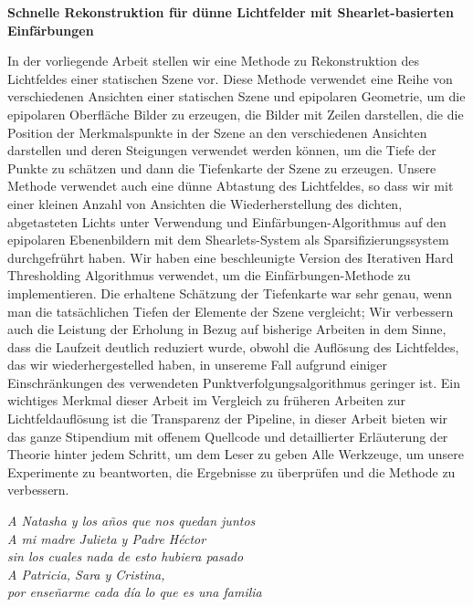 \documentclass[11pt, english, singlespacing, headsepline, ]{MastersDoctoralThesis}
\theoremstyle{definition}
\begin{document}
\begin{center}
\textbf{Schnelle Rekonstruktion für dünne Lichtfelder mit Shearlet-basierten Einf\"arbungen}
\end{center}

In der vorliegende Arbeit stellen wir eine Methode zu Rekonstruktion des Lichtfeldes einer statischen Szene vor. Diese Methode verwendet eine Reihe von verschiedenen Ansichten einer statischen Szene und epipolaren Geometrie, um die epipolaren Oberfläche Bilder zu erzeugen, die Bilder mit Zeilen darstellen, die die Position der Merkmalspunkte in der Szene an den verschiedenen Ansichten darstellen und deren Steigungen verwendet werden k\"onnen, um die Tiefe der Punkte zu sch\"atzen und dann die Tiefenkarte der Szene zu erzeugen. Unsere Methode verwendet auch eine d\"unne Abtastung des Lichtfeldes, so dass wir mit einer kleinen Anzahl von Ansichten die Wiederherstellung des dichten, abgetasteten Lichts unter Verwendung und Einf\"arbungen-Algorithmus auf den epipolaren Ebenenbildern mit dem Shearlets-System als Sparsifizierungssystem durchgefr\"uhrt haben. Wir haben eine beschleunigte Version des Iterativen Hard Thresholding Algorithmus verwendet, um die Einf\"arbungen-Methode zu implementieren. Die erhaltene Sch\"atzung der Tiefenkarte war sehr genau, wenn man die tats\"achlichen Tiefen der Elemente der Szene vergleicht; Wir verbessern auch die Leistung der Erholung in Bezug auf bisherige Arbeiten in dem Sinne, dass die Laufzeit deutlich reduziert wurde, obwohl die Aufl\"osung des Lichtfeldes, das wir wiederhergestelled haben, in unsereme Fall aufgrund einiger Einschr\"ankungen des verwendeten Punktverfolgungsalgorithmus geringer ist. Ein wichtiges Merkmal dieser Arbeit im Vergleich zu fr\"uheren Arbeiten zur Lichtfeldauflösung ist die Transparenz der Pipeline, in dieser Arbeit bieten wir das ganze Stipendium mit offenem Quellcode und detaillierter Erläuterung der Theorie hinter jedem Schritt, um dem Leser zu geben Alle Werkzeuge, um unsere Experimente zu beantworten, die Ergebnisse zu \"uberpr\"ufen und die Methode zu verbessern.

\clearpage\pagestyle{empty}
\begin{flushleft}
\textit{A Natasha y los años que nos quedan juntos\\
A mi madre Julieta y Padre Héctor \\
sin los cuales nada de esto hubiera pasado\\
A Patricia, Sara y Cristina, \\
por enseñarme cada día lo que es una familia}
\end{flushleft}
\end{document}
